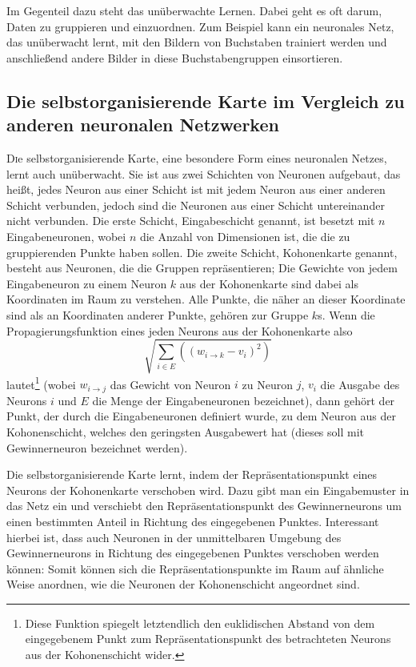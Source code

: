 \documentclass[twoside,a4paper,draft]{article}
\newcommand{\commonlettrine}[1]{\lettrine[nindent=0em,lines=2]{#1}}
\begin{document}
\begin{multicols}{2}
Im Gegenteil dazu steht das unüberwachte Lernen. Dabei geht es oft darum, Daten zu gruppieren und einzuordnen. Zum Beispiel kann ein neuronales Netz, das unüberwacht lernt, mit den Bildern von Buchstaben trainiert werden und anschließend andere Bilder in diese Buchstabengruppen einsortieren.

\subsection{Die selbstorganisierende Karte im Vergleich zu anderen neuronalen Netzwerken}

\commonlettrine{D}ie selbstorganisierende Karte, eine besondere Form eines neuronalen Netzes, lernt auch unüberwacht. Sie ist aus zwei Schichten von Neuronen aufgebaut, das heißt, jedes Neuron aus einer Schicht ist mit jedem Neuron aus einer anderen Schicht verbunden, jedoch sind die Neuronen aus einer Schicht untereinander nicht verbunden. Die erste Schicht, Eingabeschicht genannt, ist besetzt mit \(n\) Eingabeneuronen, wobei \(n\) die Anzahl von Dimensionen ist, die die zu gruppierenden Punkte haben sollen. Die zweite Schicht, Kohonenkarte genannt, besteht aus Neuronen, die die Gruppen repräsentieren; Die Gewichte von jedem Eingabeneuron zu einem Neuron \(k\) aus der Kohonenkarte sind dabei als Koordinaten im Raum zu verstehen. Alle Punkte, die näher an dieser Koordinate sind als an Koordinaten anderer Punkte, gehören zur Gruppe \(k\)s. Wenn die Propagierungsfunktion eines jeden Neurons aus der Kohonenkarte also
\[
\sqrt{\sum_{i\in{}E} \left((w_{i\rightarrow{}k} - v_i)^2\right)}
\]
lautet\footnote{Diese Funktion spiegelt letztendlich den euklidischen Abstand von dem eingegebenem Punkt zum Repräsentationspunkt des betrachteten Neurons aus der Kohonenschicht wider.} (wobei \(w_{i\rightarrow{}j}\) das Gewicht von Neuron \(i\) zu Neuron \(j\), \(v_i\) die Ausgabe des Neurons \(i\) und \(E\) die Menge der Eingabeneuronen bezeichnet), dann gehört der Punkt, der durch die Eingabeneuronen definiert wurde, zu dem Neuron aus der Kohonenschicht, welches den geringsten Ausgabewert hat (dieses soll mit \glqq{}Gewinnerneuron\grqq{} bezeichnet werden).

Die selbstorganisierende Karte lernt, indem der Repräsentationspunkt eines Neurons der Kohonenkarte verschoben wird. Dazu gibt man ein Eingabemuster in das Netz ein und verschiebt den Repräsentationspunkt des Gewinnerneurons um einen bestimmten Anteil in Richtung des eingegebenen Punktes. Interessant hierbei ist, dass auch Neuronen in der unmittelbaren Umgebung des Gewinnerneurons in Richtung des eingegebenen Punktes verschoben werden können: Somit können sich die Repräsentationspunkte im Raum auf ähnliche Weise anordnen, wie die Neuronen der Kohonenschicht angeordnet sind.


\end{multicols}
\end{document}
